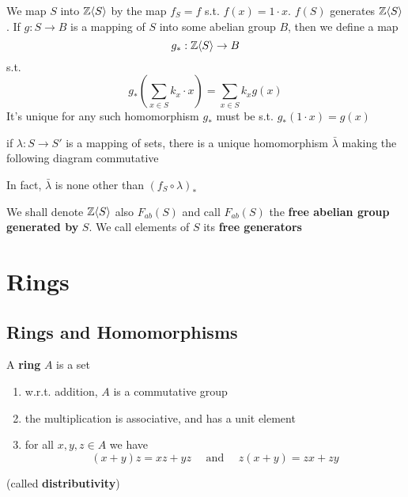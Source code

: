 \documentclass[11pt]{article}
\begin{document}
We map \(S\) into \(\mathbb{Z}\langle S\rangle\) by the map \(f_S=f\) s.t. \(f(x)=1\cdot x\). \(f(S)\)
generates \(\mathbb{Z}\langle S\rangle\). If \(g:S\to B\) is a mapping of \(S\) into some abelian group \(B\), then
we define a map
\begin{equation*}
g_*:\mathbb{Z}\langle S\rangle\to B
\end{equation*}
s.t.
\begin{equation*}
g_*\left( \sum_{x\in S}k_x\cdot x \right)=\sum_{x\in S}k_xg(x)
\end{equation*}
It's unique for any such homomorphism \(g_*\) must be s.t. \(g_*(1\cdot x)=g(x)\)
\begin{proposition}[]
if \(\lambda:S\to S'\) is a mapping of sets, there is a unique homomorphism \(\bar{\lambda}\) making the
following diagram commutative
\begin{center}\end{center}
In fact, \(\bar{\lambda}\) is none other than \((f_S\circ\lambda)_*\)
\end{proposition}

We shall denote \(\mathbb{Z}\langle S\rangle\) also \(F_{ab}(S)\) and call \(F_{ab}(S)\) the \textbf{free abelian group}
\textbf{generated by} \(S\). We call elements of \(S\) its \textbf{free generators}


\section{Rings}
\label{sec:org1770ed0}
\subsection{Rings and Homomorphisms}
\label{sec:org3af7b52}
A \textbf{ring} \(A\) is a set
\begin{enumerate}
\item w.r.t. addition, \(A\) is a commutative group
\item the multiplication is associative, and has a unit element
\item for all \(x,y,z\in A\) we have
\begin{equation*}
(x+y)z=xz+yz \quad\text{ and }\quad z(x+y)=zx+zy
\end{equation*}
\end{enumerate}
(called \textbf{distributivity})
\end{document}
